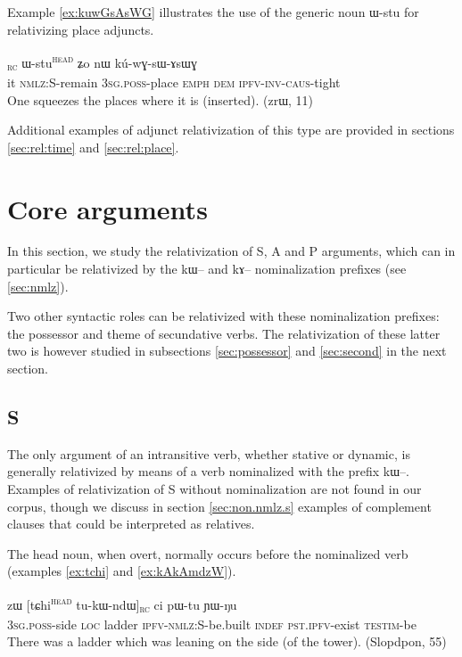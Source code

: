 \documentclass[oldfontcommands,oneside,a4paper,11pt]{article}
\newcommand{\ipa}[1]{{\phon #1}} %
\newcommand{\topic}{\textsc{dem}}
\newcommand{\tete}{\textsuperscript{\textsc{head}}}
\newcommand{\rc}{\textsubscript{\textsc{rc}}}
\begin{document}

Example \ref{ex:kuwGsAsWG} illustrates the use of the generic noun \ipa{ɯ-stu} for relativizing place adjuncts.

\begin{exe}
\ex \label{ex:kuwGsAsWG}
\gll
[\ipa{ɯʑo}  	\ipa{kɯ-rɤʑi}]\rc{}  	\ipa{ɯ-stu}\tete{} \ipa{ʑo} 	\ipa{nɯ}  	\ipa{kú-wɣ-sɯ-ɤsɯɣ}  \\
it \textsc{nmlz:S}-remain \textsc{3sg.poss}-place \textsc{emph} \topic{}  \textsc{ipfv-inv-caus}-tight \\
\glt One squeezes the places where it is (inserted). (zrɯ, 11)
  \end{exe}

Additional examples of adjunct relativization of this type are provided in sections \ref{sec:rel:time} and \ref{sec:rel:place}.

\section{Core arguments} \label{sec:core}
In this section, we study the relativization of S, A and P arguments, which can in particular be relativized by the \ipa{kɯ}-- and \ipa{kɤ}-- nominalization prefixes (see \ref{sec:nmlz}).

Two other syntactic roles can be relativized with these nominalization prefixes: the possessor and theme of secundative verbs. The relativization of these latter two is however studied in subsections \ref{sec:possessor} and \ref{sec:second} in the next section.

\subsection{S} \label{sec:s.rel}
The only argument of an intransitive verb, whether stative or dynamic, is generally relativized by means of a verb nominalized with the prefix \ipa{kɯ}--. Examples of relativization of S without nominalization are   not found in our corpus, though we discuss in section \ref{sec:non.nmlz.s} examples of complement clauses that could be interpreted as relatives.

The head noun, when overt, normally occurs   before the nominalized verb (examples \ref{ex:tchi} and \ref{ex:kAkAmdzW}). 

 
 \begin{exe}
   \ex   \label{ex:tchi}
 \gll  	\ipa{ɯ-ɣmbɤj}  	\ipa{zɯ}  	[\ipa{tɕhi}\tete{}  	\ipa{tu-kɯ-ndɯ}]\rc{}  	\ipa{ci}  	\ipa{pɯ-tu}  	\ipa{ɲɯ-ŋu}  		\\
\textsc{3sg.poss}-side \textsc{loc} ladder \textsc{ipfv-nmlz:S}-be.built  \textsc{indef} \textsc{pst.ipfv}-exist \textsc{testim}-be  \\
 \glt    There was a ladder which was leaning on the side (of the tower). (Slopdpon, 55)
   \end{exe} 
\end{document}
